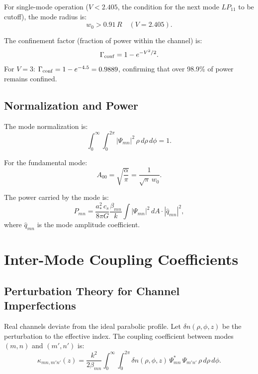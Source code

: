 \documentclass[twocolumn,superscriptaddress,prd]{revtex4-2}
\begin{document}
For single-mode operation ($V < 2.405$, the condition for the
next mode $LP_{11}$ to be cutoff), the mode radius is:
\begin{equation}
w_0 > 0.91\,R \quad (V = 2.405).
\end{equation}

The confinement factor (fraction of power within the channel) is:
\begin{equation}
\Gamma_{\rm conf} = 1 - e^{-V^2/2}.
\label{eq:confinement}
\end{equation}
For $V = 3$: $\Gamma_{\rm conf} = 1 - e^{-4.5} = 0.9889$, confirming
that over 98.9\% of power remains confined.

\subsection{Normalization and Power}

The mode normalization is:
\begin{equation}
\int_0^\infty \int_0^{2\pi} |\Psi_{mn}|^2\,\rho\,d\rho\,d\phi = 1.
\end{equation}

For the fundamental mode:
\begin{equation}
A_{00} = \sqrt{\frac{\alpha}{\pi}} = \frac{1}{\sqrt{\pi}\,w_0}.
\end{equation}

The power carried by the mode is:
\begin{equation}
P_{mn} = \frac{a_*^2\,c_s}{8\pi G}\frac{\beta_{mn}}{k}\int|\Psi_{mn}|^2\,dA \cdot |\hat{q}_{mn}|^2,
\label{eq:mode-power}
\end{equation}
where $\hat{q}_{mn}$ is the mode amplitude coefficient.

\section{Inter-Mode Coupling Coefficients}
\label{sec:coupling}

\subsection{Perturbation Theory for Channel Imperfections}

Real channels deviate from the ideal parabolic profile.
Let $\delta n(\rho,\phi,z)$ be the perturbation to the
effective index.  The coupling coefficient between modes
$(m,n)$ and $(m',n')$ is:
\begin{equation}
\kappa_{mn,m'n'}(z) = \frac{k^2}{2\beta_{mn}}\int_0^\infty\int_0^{2\pi}
\delta n(\rho,\phi,z)\,\Psi_{mn}^*\,\Psi_{m'n'}\,\rho\,d\rho\,d\phi.
\label{eq:coupling-coeff}
\end{equation}
\end{document}
